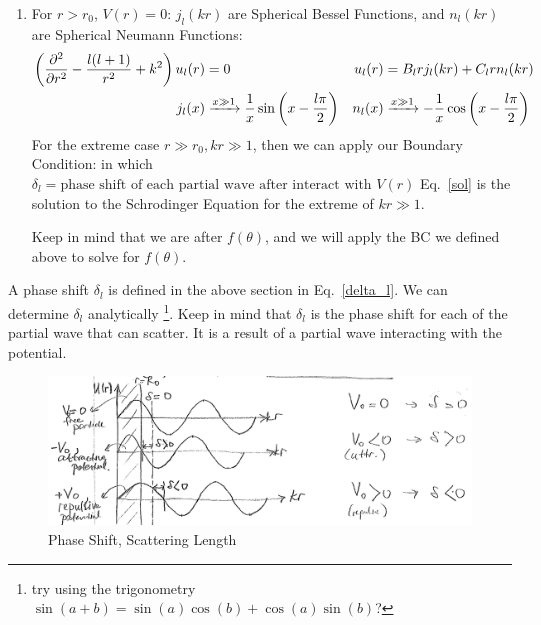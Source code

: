 \documentclass{school-22.101-notes}
\begin{document}
\begin{enumerate}
\item For $r>r_0$, $V(r) =0$: $j_l (kr)$ are Spherical Bessel Functions, and $n_l (kr)$ are Spherical Neumann Functions:
\begin{align}
\left( \frac{\partial^{2} }{\partial r ^{2}} - \frac{l(l+1)}{r^2} + k^2  \right) u_l (r) &= 0  & u_l (r) &= B_l r j_l (kr) + C_l r n_l (kr)  \\
j_l (x) &\xrightarrow{x \gg 1} \frac{1}{x} \sin \left( x - \frac{l \pi}{2} \right) & n_l (x) &\xrightarrow{x \gg 1} - \frac{1}{x} \cos \left( x - \frac{l \pi}{2} \right) 
\end{align}
For the extreme case $r \gg r_0, kr \gg 1$, then we can apply our Boundary Condition: 
in which $ \delta_l = \mbox{phase shift of each partial wave after interact with $V(r)$} $
Eq.~\ref{sol} is the solution to the Schrodinger Equation for the extreme of $kr \gg 1$. 

Keep in mind that we are after $f(\theta)$, and we will apply the BC we defined above to solve for $f(\theta)$. 
\end{enumerate}


A phase shift $\delta_l$ is defined in the above section in Eq.~\ref{delta_l}. We can determine $\delta_l$ analytically \footnote{try using the trigonometry $\sin(a+b) = \sin(a) \cos (b) + \cos(a) \sin(b)$?}. Keep in mind that $\delta_l$ is the phase shift for each of the partial wave that can scatter. It is a result of a partial wave interacting with the potential.  
\begin{figure}[ht]
    \centering
    \includegraphics[width=4.5in]{images/scattering/scattering-potential-phase-shift.png}
    \caption{Phase Shift, Scattering Length }
\end{figure}
\end{document}
